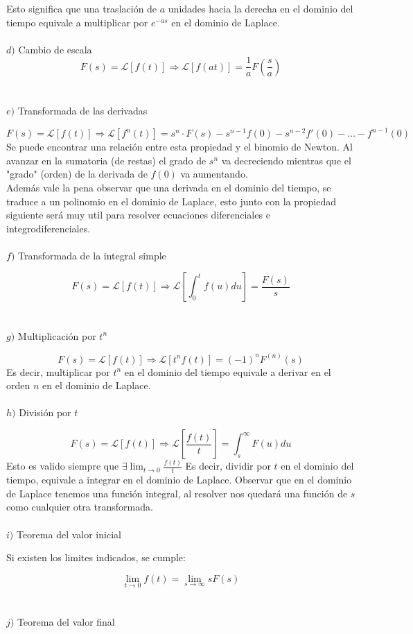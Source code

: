 \documentclass[]{article}
\begin{document}
Esto significa que una traslación de $a$ unidades hacia la derecha en el dominio del tiempo equivale a multiplicar por $e^{-as}$ en el dominio de Laplace.
\\
\\
$d)$ Cambio de escala
$$
F(s) = \mathscr{L}[f(t)] \Rightarrow \mathscr{L}[f(at)] = \frac{1}{a}F(\frac{s}{a})	
$$
\\
\\
$e)$ Transformada de las derivadas

$$
F(s) = \mathscr{L}[f(t)] \Rightarrow \mathscr{L}[f^{n}(t)] = s^{n}\cdot F(s) -s^{n-1}f(0) - s^{n-2} f'(0) - \dots - f^{n-1}(0)
$$
Se puede encontrar una relación entre esta propiedad y el binomio de Newton. Al avanzar en la sumatoria (de restas) el grado de $s^{n}$ va decreciendo mientras que el "grado" (orden) de la derivada de $f(0)$ va aumentando.\\
Además vale la pena observar que una derivada en el dominio del tiempo, se traduce a un polinomio en el dominio de Laplace, esto junto con la propiedad siguiente será muy util para resolver ecuaciones diferenciales e integrodiferenciales.
\\
\\
$f)$ Transformada de la integral simple

$$
F(s) = \mathscr{L}[f(t)] \Rightarrow \mathscr{L}[\int_{0}^{t}f(u)du] = \frac{F(s)}{s}
$$
\\
\\
$g)$ Multiplicación por $t^{n}$

$$
F(s) = \mathscr{L}[f(t)] \Rightarrow \mathscr{L}[t^{n}f(t)] = (-1)^{n}F^{(n)}(s)
$$
Es decir, multiplicar por $t^{n}$	en el dominio del tiempo equivale a derivar en el orden $n$ en el dominio de Laplace.
\\
\\
$h)$ División por $t$

$$
F(s) = \mathscr{L}[f(t)] \Rightarrow \mathscr{L}[\frac{f(t)}{t}] = \int_{s}^{\infty}F(u)du
$$
Esto es valido siempre que $\exists \lim_{t\rightarrow 0} \frac{f(t)}{t}$
Es decir, dividir por $t$ en el dominio del tiempo, equivale a integrar en el dominio de Laplace. Observar que en el dominio de Laplace tenemos una función integral, al resolver nos quedará una función de $s$ como cualquier otra transformada.
\\
\\
$i)$ Teorema del valor inicial

Si existen los limites indicados, se cumple:

$$
\lim_{t\rightarrow 0} f(t) = \lim_{s\rightarrow \infty} sF(s)
$$
\\
\\
$j)$ Teorema del valor final
\end{document}
